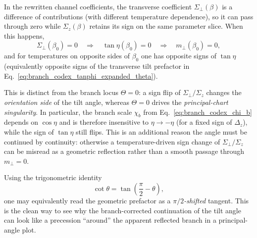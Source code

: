 In the rewritten channel coefficients, the transverse coefficient
$\Sigma_\perp(\beta)$ is a difference of contributions (with different
temperature dependence), so it can pass through zero while $\Sigma_z(\beta)$
retains its sign on the same parameter slice.  When this happens,
\begin{equation}
    \Sigma_\perp(\beta_0)=0
    \quad\Longrightarrow\quad
    \tan\eta(\beta_0)=0
    \quad\Longrightarrow\quad
    m_\perp(\beta_0)=0,
    \label{eq:branch_codex_sigma_perp_zero}
\end{equation}
and for temperatures on opposite sides of $\beta_0$ one has opposite signs of
$\tan\eta$ (equivalently opposite signs of the transverse tilt prefactor in
Eq.~\eqref{eq:branch_codex_tanphi_expanded_theta}).

This is distinct from the branch locus $\Theta=0$: a sign flip of
$\Sigma_\perp/\Sigma_z$ changes the \emph{orientation side} of the tilt angle,
whereas $\Theta=0$ drives the \emph{principal-chart singularity}.  In
particular, the branch scale $\chi_b$ from Eq.~\eqref{eq:branch_codex_chi_b}
depends on $\cos\eta$ and is therefore insensitive to $\eta\to-\eta$ (for a
fixed sign of $\Delta_z$), while the sign of $\tan\eta$ still flips.  This is
an additional reason the angle must be continued by continuity: otherwise a
temperature-driven sign change of $\Sigma_\perp/\Sigma_z$ can be misread as a
geometric reflection rather than a smooth passage through $m_\perp=0$.

Using the trigonometric identity
\begin{equation}
    \cot\theta = \tan\!\left(\frac{\pi}{2}-\theta\right),
    \label{eq:branch_codex_cot_shift_identity}
\end{equation}
one may equivalently read the geometric prefactor as a \emph{$\pi/2$-shifted}
tangent.  This is the clean way to see why the branch-corrected continuation of
the tilt angle can look like a precession ``around'' the apparent reflected
branch in a principal-angle plot.

